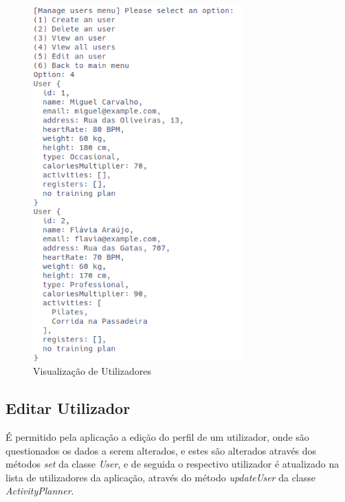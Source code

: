 \documentclass[a4paper,12pt]{scrreprt}
\begin{document}
    \begin{figure}[!ht]
        \centering
        \includegraphics[width=0.72\textwidth]{images/viewUsers.png}
        \caption{Visualização de Utilizadores}
        \label{fig:view-users}
    \end{figure}

    \clearpage
    \subsection{Editar Utilizador}
    É permitido pela aplicação a edição do perfil de um utilizador,
    onde são questionados os dados a serem alterados,
    e estes são alterados através dos métodos \textit{set} da classe \textit{User},
    e de seguida o respectivo utilizador é atualizado na lista de utilizadores da aplicação,
    através do método \textit{updateUser} da classe \textit{ActivityPlanner}.
\end{document}
